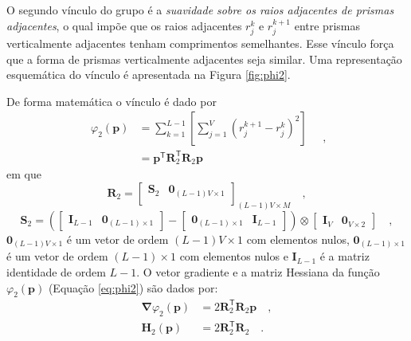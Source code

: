 O segundo vínculo do grupo é a \textit{suavidade sobre os raios adjacentes de prismas adjacentes}, o qual impõe que os raios adjacentes $r_{j}^{k}$ e $r_{j}^{k+1}$ entre prismas verticalmente adjacentes tenham comprimentos semelhantes. Esse vínculo força que a forma de prismas verticalmente adjacentes seja similar. Uma representação esquemática do vínculo é apresentada na Figura \ref{fig:phi2}.

De forma matemática o vínculo é dado por
\begin{equation}\label{eq:phi2}
\begin{split}
\varphi_{2}(\mathbf{p}) &= \sum\limits^{L-1}_{k=1}\left[\sum\limits^{V}_{j=1}\left(r^{k+1}_{j}-r^{k}_{j}\right)^2\right] \\
&= \mathbf{p}^{\mathsf{T}} \mathbf{R}^{\mathsf{T}}_{2}\mathbf{R}_{2}\mathbf{p}
\end{split} \quad ,
\end{equation}
em que
\begin{equation}
\mathbf{R}_{2} = 
\begin{bmatrix}
\mathbf{S}_{2} & \mathbf{0}_{(L-1)V \times 1} \\
\end{bmatrix}_{(L-1)V \times M} \quad ,
\label{eq:R2-matrix}
\end{equation}
\begin{equation}
\mathbf{S}_{2} =
\left( 
\begin{bmatrix} \mathbf{I}_{L-1} & \mathbf{0}_{(L-1) \times 1} \end{bmatrix} -
\begin{bmatrix} \mathbf{0}_{(L-1) \times 1} & \mathbf{I}_{L-1} \end{bmatrix} 
\right) \otimes 
\begin{bmatrix} \mathbf{I}_{V} & \mathbf{0}_{V \times 2} \end{bmatrix} \quad ,
\label{eq:S2-matrix}
\end{equation}
$\mathbf{0}_{(L-1)V \times 1}$ é um vetor de ordem $(L-1)V \times 1$ com elementos nulos,
$\mathbf{0}_{(L-1) \times 1}$ é um vetor de ordem $(L-1) \times 1$ com elementos nulos e 
$\mathbf{I}_{L-1}$ é a matriz identidade de ordem $L-1$. O vetor gradiente e a matriz Hessiana da função $\varphi_{2}(\mathbf{p})$ (Equação \ref{eq:phi2}) são dados por:
\begin{equation}\label{eq:phi2_gh}
\begin{split}
\boldsymbol{\nabla}\varphi_{2}(\mathbf{p}) &= 2\mathbf{R}^\mathsf{T}_{2}\mathbf{R}_{2}\mathbf{p} \quad ,\\
\mathbf{H}_{2}(\mathbf{p}) &= 2\mathbf{R}^\mathsf{T}_{2}\mathbf{R}_{2} \quad .
\end{split}
\end{equation}

